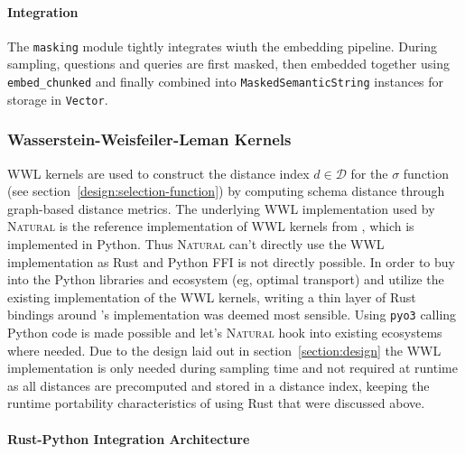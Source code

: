 
\paragraph{Integration}

The \texttt{masking} module tightly integrates wiuth the embedding pipeline.
During sampling, questions and queries are first masked, then embedded together
using \texttt{embed\_chunked} and finally combined into
\texttt{MaskedSemanticString} instances for storage in \texttt{Vector}.

\subsubsection{Wasserstein-Weisfeiler-Leman Kernels}

WWL kernels are used to construct the distance index $d \in \mathcal{D}$
for the $\sigma$ function (see section~\ref{design:selection-function})
by computing schema distance through graph-based distance metrics. The
underlying WWL implementation used by \textsc{Natural} is the reference
implementation of WWL kernels from \citeauthor{WWL}, which is implemented in
Python. Thus \textsc{Natural} can't directly use the WWL implementation
as Rust and Python FFI is not directly possible. In order to buy into the
Python libraries and ecosystem (eg, optimal transport) and utilize the existing
implementation of the WWL kernels, writing a thin layer of Rust bindings around
\citeauthor{WWL}'s implementation was deemed most sensible. Using \texttt{pyo3}
calling Python code is made possible and let's \textsc{Natural} hook into
existing ecosystems where needed. Due to the design laid out in
section~\ref{section:design} the WWL implementation is only needed during
sampling time and not required at runtime as all distances are precomputed and
stored in a distance index, keeping the runtime portability characteristics of
using Rust that were discussed above.



\paragraph{Rust-Python Integration Architecture}

